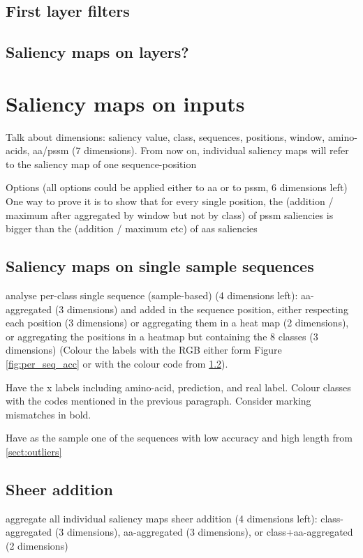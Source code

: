 	\subsection{First layer filters}
	
	\subsection{Saliency maps on layers?}


\section{Saliency maps on inputs}
Talk about dimensions: saliency value, class, sequences, positions, window, amino-acids, aa/pssm (7 dimensions). From now on, individual saliency maps will refer to the saliency map of one sequence-position

Options (all options could be applied either to aa or to pssm, 6 dimensions left)
One way to prove it is to show that for every single position, the (addition / maximum after aggregated by window but not by class) of pssm saliencies is bigger than the (addition / maximum etc) of aas saliencies
	
	\subsection{Saliency maps on single sample sequences}
	analyse per-class single sequence (sample-based) (4 dimensions left): aa-aggregated (3 dimensions) and added in the sequence position, either respecting each position (3 dimensions) or aggregating them in a heat map (2 dimensions), or aggregating the positions in a heatmap but containing the 8 classes (3 dimensions) (Colour the labels with the RGB either form Figure \ref{fig:per_seq_acc} or with the colour code from \ref{sect:sheer}).
	
	Have the x labels including amino-acid, prediction, and real label. Colour classes with the codes mentioned in the previous paragraph. Consider marking mismatches in bold.
	
	Have as the sample one of the sequences with low accuracy and high length from \ref{sect:outliers}

	\subsection{Sheer addition} \label{sect:sheer}
	aggregate all individual saliency maps %
	sheer addition (4 dimensions left): class-aggregated (3 dimensions), aa-aggregated (3 dimensions), or class+aa-aggregated (2 dimensions)
